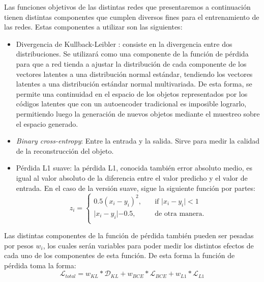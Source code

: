 \documentclass[12pt, spanish]{article}
\begin{document}
Las funciones objetivos de las distintas redes que presentaremos a
continuación tienen distintas componentes que cumplen diversos fines para
el entrenamiento de las redes. Estas componentes a utilizar son las
siguientes:
\begin{itemize}
    \item Divergencia de Kullback-Leibler \cite{Joyce2011KullbackLeiblerD}: consiste
        en la divergencia entre dos distribuciones. Se utilizará como una componente
        de la función de pérdida para que a red tienda a ajustar la distribución de
        cada componente de los vectores latentes a una distribución normal estándar,
        tendiendo los vectores latentes a una distribución estándar normal
        multivariada. De esta forma, se permite una continuidad en el espacio de los
        objetos representados por los códigos latentes que con un autoencoder
        tradicional es imposible lograrlo, permitiendo luego la generación de nuevos
        objetos mediante el muestreo sobre el espacio generado.
    \item \textit{Binary cross-entropy}: Entre la entrada y la salida. Sirve para
        medir la calidad de la reconstrucción del objeto.
    \item Pérdida L1 suave: la pérdida L1, conocida también error absoluto medio, es
        igual al valor absoluto de la diferencia entre el valor predicho y el valor
        de entrada. En el caso de la versión suave, sigue la siguiente función por
        partes:
        \[
            z_i =
            \begin{cases}
                0.5(x_i - y_i)^2, &\quad\text{if } \lvert x_i - y_i \lvert < 1  \\
                
                \lvert x_i - y_i \lvert - 0.5, &\quad\text{de otra manera.} \\
            \end{cases}
        \]
\end{itemize}
Las distintas componentes de la función de pérdida también pueden ser pesadas por
pesos $w_i$, los cuales serán variables para poder medir los distintos efectos de
cada uno de los componentes de esta función.
De esta forma la función de pérdida toma la forma:
\[
    \mathcal{L}_{total} = w_{KL} * \mathcal{D}_{KL} + w_{BCE} * \mathcal{L}_{BCE} + w_{L1} * \mathcal{L}_{L1}
\]
\end{document}
